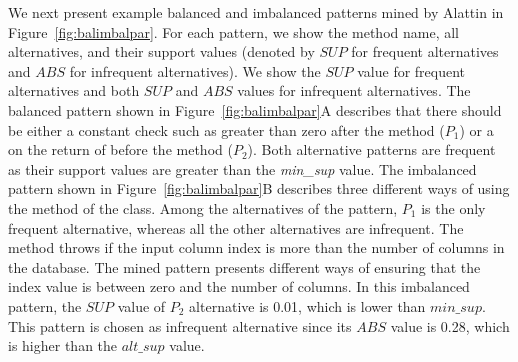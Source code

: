 We next present example balanced and imbalanced patterns mined by Alattin in Figure~\ref{fig:balimbalpar}. For each pattern, we show the method name, all alternatives, and their support values (denoted by $SUP$ for frequent alternatives and $ABS$ for infrequent alternatives). We show the $SUP$ value for frequent alternatives and both $SUP$ and $ABS$ values for infrequent alternatives. The balanced pattern shown in Figure~\ref{fig:balimbalpar}A describes that there should be either a constant check such as greater than zero after the  method ($P_1$) or a  on the return of  before the  method ($P_2$). Both alternative patterns are frequent as their support values are greater than the \emph{min\_sup} value. The imbalanced pattern shown in Figure~\ref{fig:balimbalpar}B 
describes three different ways of using the  method of the  class. Among the alternatives of the pattern, $P_1$ is the only frequent alternative, whereas all the other alternatives are infrequent. The  method throws  if the input column index is more than the number of columns in the database. The mined pattern presents different ways of ensuring that the index value is between zero and the number of columns. In this imbalanced pattern, the $SUP$ value of $P_2$ alternative is 0.01, which is lower than $min\_sup$. This pattern is chosen as infrequent alternative since its $ABS$ value is 0.28, which is higher than the $alt\_sup$ value. 

